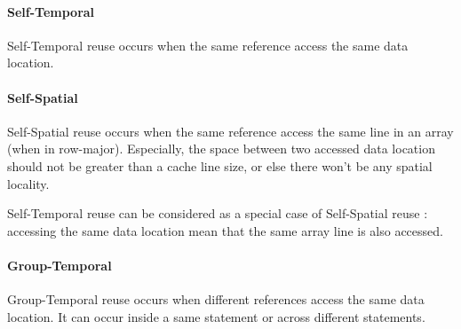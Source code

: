 \documentclass[paper=a4, fontsize=11pt]{scrartcl}
\numberwithin{equation}{section}        %
\numberwithin{figure}{section}          %
\numberwithin{table}{section}               %
\begin{document}

            \paragraph{Self-Temporal}
                Self-Temporal reuse occurs when the same reference access the same
                data location.
                

            \paragraph{Self-Spatial}
                Self-Spatial reuse occurs when the same reference access the same
                line in an array (when in row-major). Especially, the space between
                two accessed data location should not be greater than a cache line size,
                or else there won't be any spatial locality.


                Self-Temporal reuse can be considered as a special case of
                Self-Spatial reuse : accessing the same data location mean that
                the same array line is also accessed.
            \paragraph{Group-Temporal}
                Group-Temporal reuse occurs when different references access the same
                data location. It can occur inside a same statement or across different
                statements.

\end{document}
